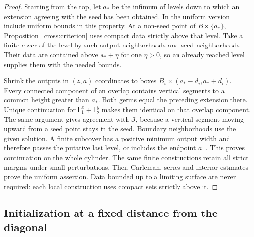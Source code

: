 \begin{proof}
Starting from the top, let $a_*$ be the infimum of levels down to which
an extension agreeing with the seed has been obtained.  In the uniform
version include uniform bounds in this property.  At a non-seed point
of $B\times\{a_*\}$, Proposition~\ref{cross:criterion} uses compact
data strictly above that level.  Take a finite cover of the level by
such output neighborhoods and seed neighborhoods.  Their data are
contained above $a_*+\eta$ for one $\eta>0$, so an already reached
level supplies them with the needed bounds.

Shrink the outputs in $(z,a)$ coordinates to boxes
$B_i\times(a_*-d_i,a_*+d_i)$.
Every connected component of an overlap contains vertical segments
to a common height greater than $a_*$.  Both germs equal the preceding
extension there.  Unique continuation for $\mathsf L_1^x+\mathsf L_2^y$ makes them
identical on that overlap component.  The same argument gives agreement
with $\mathcal S$, because a vertical segment moving upward from a
seed point stays in the seed.  Boundary neighborhoods use the given
solution.  A finite subcover has a positive minimum output width and
therefore passes the putative last level, or includes the endpoint
$a_-$.  This proves continuation on the whole cylinder.
The same finite constructions retain all strict margins under small
perturbations.  Their Carleman, series and interior estimates prove
the uniform assertion.  Data bounded up to a limiting surface are
never required: each local construction uses compact sets strictly
above it.
\end{proof}

\subsection{Initialization at a fixed distance from the diagonal}

